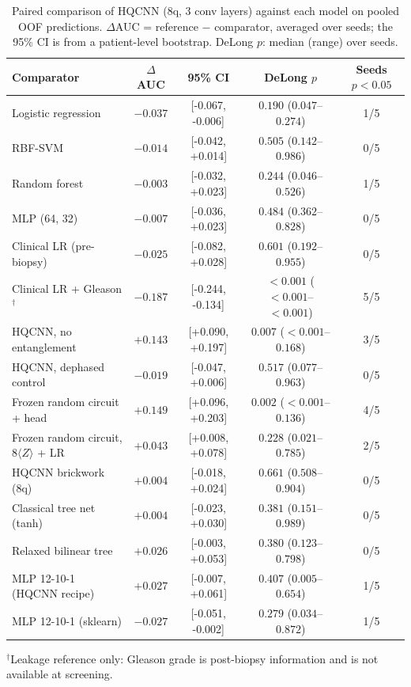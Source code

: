 \begin{table}[t]
\centering
\caption{Paired comparison of HQCNN (8q, 3 conv layers) against each model on pooled OOF predictions. $\Delta$AUC = reference $-$ comparator, averaged over seeds; the 95\% CI is from a patient-level bootstrap. DeLong $p$: median (range) over seeds.}
\label{tab:v3_delong}
\small
\begin{tabular}{lcccc}
\toprule
Comparator & $\Delta$AUC & 95\% CI & DeLong $p$ & Seeds $p<0.05$ \\
\midrule
Logistic regression & $-0.037$ & [-0.067, -0.006] & $0.190$ ($0.047$--$0.274$) & 1/5 \\
RBF-SVM & $-0.014$ & [-0.042, +0.014] & $0.505$ ($0.142$--$0.986$) & 0/5 \\
Random forest & $-0.003$ & [-0.032, +0.023] & $0.244$ ($0.046$--$0.526$) & 1/5 \\
MLP (64, 32) & $-0.007$ & [-0.036, +0.023] & $0.484$ ($0.362$--$0.828$) & 0/5 \\
Clinical LR (pre-biopsy) & $-0.025$ & [-0.082, +0.028] & $0.601$ ($0.192$--$0.955$) & 0/5 \\
Clinical LR + Gleason$^{\dagger}$ & $-0.187$ & [-0.244, -0.134] & $<0.001$ ($<0.001$--$<0.001$) & 5/5 \\
HQCNN, no entanglement & $+0.143$ & [+0.090, +0.197] & $0.007$ ($<0.001$--$0.168$) & 3/5 \\
HQCNN, dephased control & $-0.019$ & [-0.047, +0.006] & $0.517$ ($0.077$--$0.963$) & 0/5 \\
Frozen random circuit + head & $+0.149$ & [+0.096, +0.203] & $0.002$ ($<0.001$--$0.136$) & 4/5 \\
Frozen random circuit, 8$\langle Z\rangle$ + LR & $+0.043$ & [+0.008, +0.078] & $0.228$ ($0.021$--$0.785$) & 2/5 \\
HQCNN brickwork (8q) & $+0.004$ & [-0.018, +0.024] & $0.661$ ($0.508$--$0.904$) & 0/5 \\
Classical tree net (tanh) & $+0.004$ & [-0.023, +0.030] & $0.381$ ($0.151$--$0.989$) & 0/5 \\
Relaxed bilinear tree & $+0.026$ & [-0.003, +0.053] & $0.380$ ($0.123$--$0.798$) & 0/5 \\
MLP 12-10-1 (HQCNN recipe) & $+0.027$ & [-0.007, +0.061] & $0.407$ ($0.005$--$0.654$) & 1/5 \\
MLP 12-10-1 (sklearn) & $-0.027$ & [-0.051, -0.002] & $0.279$ ($0.034$--$0.872$) & 1/5 \\
\bottomrule
\end{tabular}
\par\smallskip\footnotesize $^{\dagger}$Leakage reference only: Gleason grade is post-biopsy information and is not available at screening.
\end{table}
